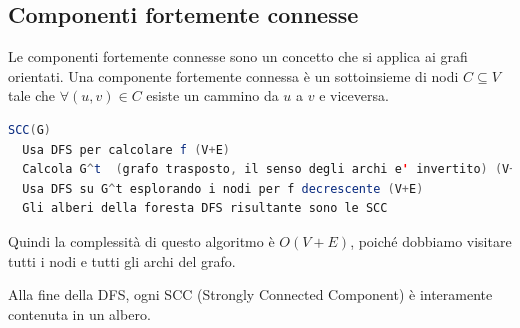 \documentclass[a4paper]{article}
\begin{document}
\subsection{Componenti fortemente connesse}

Le componenti fortemente connesse sono un concetto che si applica ai grafi orientati.
{
  Una componente fortemente connessa è un sottoinsieme di nodi $C \subseteq V$ tale che $\forall (u,v) \in C$ esiste un cammino da $u$ a $v$ e viceversa.
}

\begin{lstlisting}[language=Scala]
SCC(G)
  Usa DFS per calcolare f (V+E)
  Calcola G^t  (grafo trasposto, il senso degli archi e' invertito) (V+E)
  Usa DFS su G^t esplorando i nodi per f decrescente (V+E)
  Gli alberi della foresta DFS risultante sono le SCC 
\end{lstlisting}
\noindent
Quindi la complessità di questo algoritmo è $O(V + E)$, poiché dobbiamo visitare tutti i nodi e tutti gli archi del grafo.

\begin{lemma}
  Alla fine della DFS, ogni SCC (Strongly Connected Component) è interamente contenuta in un albero.
\end{lemma}
\end{document}
